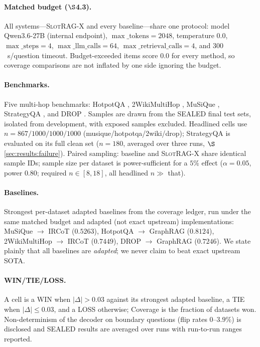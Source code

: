 \paragraph{Matched budget ($\S$4.3).}  All systems---\textsc{SlotRAG-X} and every
baseline---share one protocol: model Qwen3.6-27B \cite{qwen3} (internal endpoint),
$\max\_\mathrm{tokens}=2048$, temperature $0.0$, $\max\_\mathrm{steps}=4$,
$\max\_\mathrm{llm\_calls}=64$, $\max\_\mathrm{retrieval\_calls}=4$, and
$300$~s/question timeout. Budget-exceeded items score $0.0$ for every method,
so coverage comparisons are not inflated by one side ignoring the budget.

\paragraph{Benchmarks.}  Five multi-hop benchmarks: HotpotQA \cite{hotpotqa}, 2WikiMultiHop \cite{2wikimultihop},
MuSiQue \cite{musique}, StrategyQA \cite{strategyqa}, and DROP \cite{drop}. Samples are drawn from the SEALED final
test sets, isolated from development, with exposed samples excluded.
Headlined cells use $n=867/1000/1000/1000$ (musique/hotpotqa/2wiki/drop);
StrategyQA is evaluated on its full clean set ($n=180$, averaged over three
runs, $\S$\ref{sec:results:failure}). Paired sampling: baseline and
\textsc{SlotRAG-X} share identical sample IDs; sample size per dataset is
power-sufficient for a $5\%$ effect ($\alpha=0.05$, power $0.80$; required
$n\in[8,18]$, all headlined $n\gg$ that).

\paragraph{Baselines.}  Strongest per-dataset adapted baselines from the
coverage ledger, run under the same matched budget and adapted (not exact
upstream) implementations: MuSiQue $\rightarrow$ IRCoT \cite{ircot} ($0.5263$), HotpotQA
$\rightarrow$ GraphRAG ($0.8124$), 2WikiMultiHop $\rightarrow$ IRCoT
($0.7449$), DROP $\rightarrow$ GraphRAG \cite{graphrag} ($0.7246$). We state plainly that all
baselines are \emph{adapted}; we never claim to beat exact upstream SOTA.

\paragraph{WIN/TIE/LOSS.}  A cell is a WIN when $|\Delta|>0.03$ against its
strongest adapted baseline, a TIE when $|\Delta|\le 0.03$, and a LOSS
otherwise; Coverage is the fraction of datasets won. Non-determinism of the
decoder on boundary questions (flip rates $0$--$3.9\%$) is disclosed and
SEALED results are averaged over runs with run-to-run ranges reported.

